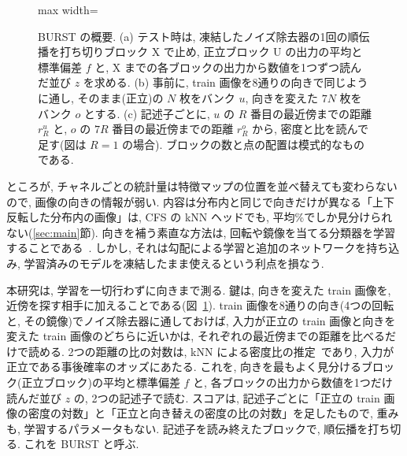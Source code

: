 \documentclass[MIRU,submit]{miru2025j}
\makeatletter
\newcommand{\method}{BURST}               %
\renewenvironment{figure*}{\@floatenv\capwidth\textwidth\ecapwidth\textwidth\abovecaptionskip1mm\belowcaptionskip\z@\@dblfloat{figure}}{\end@dblfloat}
\makeatother
\begin{document}
\begin{figure}[t]\centering
\begin{adjustbox}{max width=\textwidth}\end{adjustbox}
\caption{\method{} の概要. (a) テスト時は, 凍結したノイズ除去器の1回の順伝播を打ち切りブロック X で止め, 正立ブロック U の出力の平均と標準偏差 $f$ と, X までの各ブロックの出力から数値を1つずつ読んだ並び $z$ を求める. (b) 事前に, train 画像を8通りの向きで同じように通し, そのまま(正立)の $N$ 枚をバンク $u$, 向きを変えた $7N$ 枚をバンク $o$ とする. (c) 記述子ごとに, $u$ の $R$ 番目の最近傍までの距離 $r^{u}_{R}$ と, $o$ の $7R$ 番目の最近傍までの距離 $r^{o}_{R}$ から, 密度と比を読んで足す(図は $R=1$ の場合). ブロックの数と点の配置は模式的なものである.}
\label{fig:method}
\end{figure}

ところが, チャネルごとの統計量は特徴マップの位置を並べ替えても変わらないので, 画像の向きの情報が弱い. 内容は分布内と同じで向きだけが異なる「上下反転した分布内の画像」は, CFS の kNN ヘッドでも, 平均\nPriorUdT\%でしか見分けられない(\ref{sec:main}節). 向きを補う素直な方法は, 回転や鏡像を当てる分類器を学習することである~\cite{golan2018geometric,hendrycks2019ss,tack2020csi}. しかし, それは勾配による学習と追加のネットワークを持ち込み, 学習済みのモデルを凍結したまま使えるという利点を損なう.

本研究は, 学習を一切行わずに向きまで測る. 鍵は, 向きを変えた train 画像を, 近傍を探す相手に加えることである(図~\ref{fig:method}). train 画像を8通りの向き(4つの回転と, その鏡像)でノイズ除去器に通しておけば, 入力が正立の train 画像と向きを変えた train 画像のどちらに近いかは, それぞれの最近傍までの距離を比べるだけで読める. 2つの距離の比の対数は, kNN による密度比の推定~\cite{wang2009divergence}であり, 入力が正立である事後確率のオッズにあたる. これを, 向きを最もよく見分けるブロック(正立ブロック)の平均と標準偏差 $f$ と, 各ブロックの出力から数値を1つだけ読んだ並び $z$ の, 2つの記述子で読む. スコアは, 記述子ごとに「正立の train 画像の密度の対数」と「正立と向き替えの密度の比の対数」を足したもので, 重みも, 学習するパラメータもない. 記述子を読み終えたブロックで, 順伝播を打ち切る. これを \method{} と呼ぶ.
\end{document}
